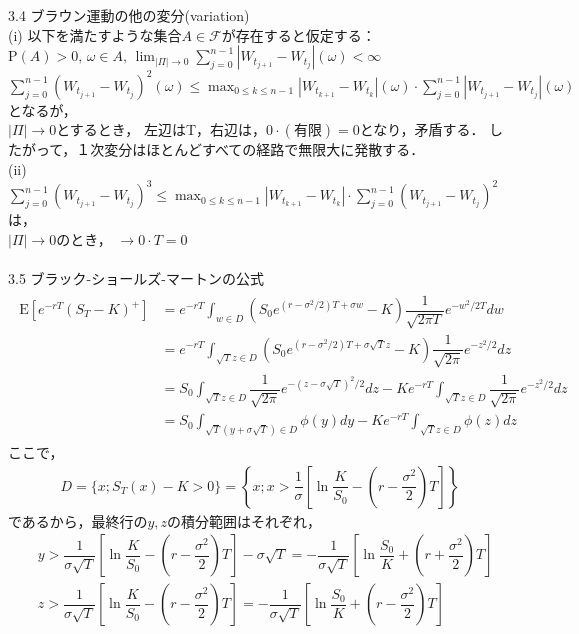 \documentclass[a4paper,11pt]{jsarticle}
\newcommand{\df}[2]{\dfrac{#1}{#2}}
\newcommand{\E}{\mathrm{E}}
\newcommand{\F}{\mathcal{F}}
\begin{document}
\\ \\
3.4 ブラウン運動の他の変分(variation) \\
(i)
以下を満たすような集合$A\in\F$が存在すると仮定する：\\
$\mathrm{P}(A)>0, \, \omega \in A, \,
\lim_{|\Pi| \to 0}\sum_{j=0}^{n-1}|W_{t_{j+1}}-W_{t_{j}}|(\omega) < \infty$ \\
$\sum_{j=0}^{n-1}(W_{t_{j+1}}-W_{t_{j}})^2(\omega) \leq
\max_{0\leq k\leq n-1}|W_{t_{k+1}}-W_{t_{k}}|(\omega)\cdot
\sum_{j=0}^{n-1}|W_{t_{j+1}}-W_{t_{j}}|(\omega)$ となるが，\\
$|\Pi| \to 0$とするとき，
左辺はT，右辺は，$0\cdot(有限)=0$となり，矛盾する．
したがって，１次変分はほとんどすべての経路で無限大に発散する．\\
(ii)
$\sum_{j=0}^{n-1}(W_{t_{j+1}}-W_{t_{j}})^3 \leq
\max_{0\leq k\leq n-1}|W_{t_{k+1}}-W_{t_{k}}|\cdot
\sum_{j=0}^{n-1}(W_{t_{j+1}}-W_{t_{j}})^2$は，\\
$|\Pi|\to 0$のとき，
$\to 0\cdot T=0$
\\ \\
3.5 ブラック-ショールズ-マートンの公式
\begin{align*}
  \begin{split}
    \E[e^{-rT}(S_T-K)^+]
    &=e^{-rT}\int_{w\in D} (S_0e^{(r-\sigma^2/2)T+\sigma w}-K)
    \df{1}{\sqrt{2\pi T}}e^{-w^2/2T} dw \\
    &=e^{-rT}\int_{\sqrt{T}z\in D} (S_0e^{(r-\sigma^2/2)T+\sigma \sqrt{T}z}-K)
    \df{1}{\sqrt{2\pi}}e^{-z^2/2} dz \\
    &=S_0 \int_{\sqrt{T}z\in D}
    \df{1}{\sqrt{2\pi}}e^{-(z-\sigma \sqrt{T})^2/2} dz
    -K e^{-rT} \int_{\sqrt{T}z\in D}
    \df{1}{\sqrt{2\pi}}e^{-z^2/2} dz \\
    &=S_0 \int_{\sqrt{T}(y+\sigma\sqrt{T})\in D}\phi(y)dy
    -K e^{-rT} \int_{\sqrt{T}z\in D}\phi(z)dz
  \end{split}
\end{align*}
ここで，
\begin{align*}
  D=\{x;S_T(x)-K>0\}=\left\{x; x>\df{1}{\sigma} \left[\ln{\df{K}{S_0}}
  -\left(r-\df{\sigma^2}{2}\right) T \right] \right\}
\end{align*}
であるから，最終行の$y,z$の積分範囲はそれぞれ，
\begin{align*}
  &y>\df{1}{\sigma\sqrt{T}} \left[\ln{\df{K}{S_0}}
  -\left(r-\df{\sigma^2}{2}\right) T \right] - \sigma\sqrt{T}
  =-\df{1}{\sigma\sqrt{T}} \left[\ln{\df{S_0}{K}}
  +\left(r+\df{\sigma^2}{2}\right) T \right] \\
  & z>\df{1}{\sigma\sqrt{T}} \left[\ln{\df{K}{S_0}}
  -\left(r-\df{\sigma^2}{2}\right) T \right]
  =-\df{1}{\sigma\sqrt{T}} \left[\ln{\df{S_0}{K}}
  +\left(r-\df{\sigma^2}{2}\right) T \right]
\end{align*}
\end{document}
